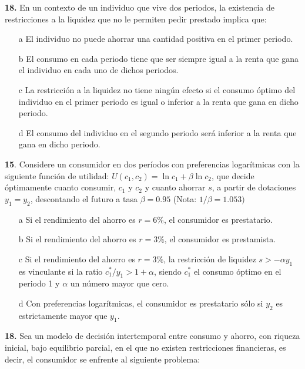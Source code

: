 \documentclass{nuevotema}
\begin{document}
\textbf{18.} En un contexto de un individuo que vive dos periodos, la existencia de restricciones a la liquidez que no le permiten pedir prestado implica que:

\begin{enumerate}
    \item[a] El individuo no puede ahorrar una cantidad positiva en el primer periodo.
    \item[b] El consumo en cada periodo tiene que ser siempre igual a la renta que gana el individuo en cada uno de dichos periodos.
    \item[c] La restricción a la liquidez no tiene ningún efecto si el consumo óptimo del individuo en el primer periodo es igual o inferior a la renta que gana en dicho periodo.
    \item[d] El consumo del individuo en el segundo periodo será inferior a la renta que gana en dicho periodo.
\end{enumerate}

\textbf{15}. Considere un consumidor en dos períodos con preferencias logarítmicas con la siguiente función de utilidad: $U(c_1, c_2) = \ln c_1 + \beta \ln c_2$, que decide óptimamente cuanto consumir, $c_1$ y $c_2$ y cuanto ahorrar $s$, a partir de dotaciones $y_1= y_2$, descontando el futuro a tasa $\beta = 0.95$ (Nota: $1/\beta = 1.053)$

\begin{enumerate}
    \item[a] Si el rendimiento del ahorro es $r=6\%$, el consumidor es prestatario.
    \item[b] Si el rendimiento del ahorro es $r=3\%$, el consumidor es prestamista.
    \item[c] Si el rendimiento del ahorro es $r=3\%$, la restricción de liquidez $s > -\alpha y_1$ es vinculante si la ratio $c_1^* / y_1 > 1 + \alpha$, siendo $c_1^*$ el consumo óptimo en el periodo 1 y $\alpha$ un número mayor que cero.
    \item[d] Con preferencias logarítmicas, el consumidor es prestatario sólo si $y_2$ es estrictamente mayor que $y_1$.
\end{enumerate}


\textbf{18.} Sea un modelo de decisión intertemporal entre consumo y ahorro, con riqueza inicial, bajo equilibrio parcial, en el que no existen restricciones financieras, es decir, el consumidor se enfrente al siguiente problema:
\end{document}
